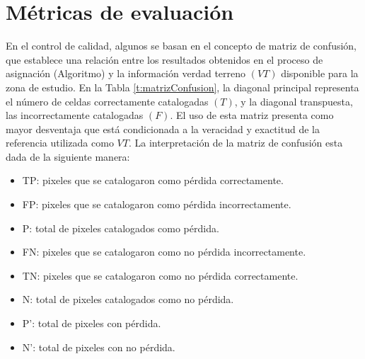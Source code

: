 \section{M\'etricas de evaluaci\'on}
En el control de calidad, algunos se basan en el concepto de matriz de confusi\'on, que establece una relaci\'on entre los resultados obtenidos en el proceso de asignaci\'on (Algoritmo) y la informaci\'on verdad terreno $ (VT) $ disponible para la zona de estudio. En la Tabla \ref{t:matrizConfusion}, la diagonal principal representa el n\'umero de celdas correctamente catalogadas $ (T) $, y la diagonal transpuesta, las incorrectamente catalogadas $ (F) $. El uso de esta matriz presenta como mayor desventaja que est\'a condicionada a la veracidad y exactitud de la referencia utilizada como $ VT $. La interpretaci\'on de la matriz de confusi\'on esta dada de la siguiente manera:
\begin{itemize}
	\item TP: pixeles que se catalogaron como p\'erdida correctamente.
	\item FP: pixeles que se catalogaron como p\'erdida incorrectamente.
	\item P: total de pixeles catalogados como p\'erdida.
	\item FN: pixeles que se catalogaron como no p\'erdida incorrectamente.
	\item TN: pixeles que se catalogaron como no p\'erdida correctamente.
	\item N: total de pixeles catalogados como no p\'erdida.
	\item P': total de pixeles con p\'erdida.
	\item N': total de pixeles con no p\'erdida.
\end{itemize}

